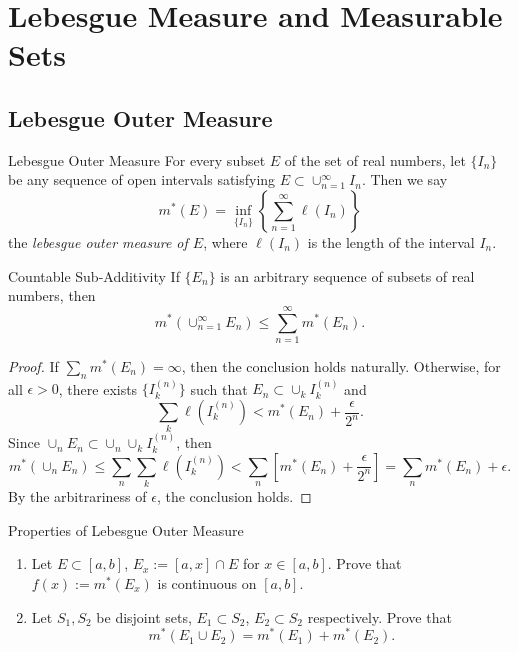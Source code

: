 
\section{Lebesgue Measure and Measurable Sets}

\subsection{Lebesgue Outer Measure}

\begin{definition}{Lebesgue Outer Measure}{}
  For every subset $E$ of the set of real numbers,
  let $\{I_n\}$ be any sequence of open intervals satisfying
  $E \subset \cup _{n = 1}^{\infty} I_n$. Then we say
  \begin{equation}
    m^{\ast} (E) = \inf_{\{I_n\}} \left\{\sum_{n = 1}^{\infty} \ell(I_n)\right\}
  \end{equation}
  the \emph{lebesgue outer measure of $E$},
  where $\ell(I_n)$ is the length of the interval $I_n$.
\end{definition}


\begin{proposition}{Countable Sub-Additivity}{}
  If $\{E_n\}$ is an arbitrary sequence of subsets of real numbers,
  then
  \begin{equation}
    m^{\ast} (\cup _{n = 1}^{\infty} E_n) \leq \sum _{n = 1}^{\infty} m^{\ast}(E_n).
  \end{equation}
\end{proposition}

\begin{proof}
  If $\sum_n m^{\ast}(E_n) = \infty$, then the conclusion holds naturally.
  Otherwise, for all $\epsilon > 0$, there exists $\{I_k^{(n)}\}$ such that
  $E_n \subset \cup_k I_k^{(n)}$ and
  \begin{equation}
    \sum \limits _k \ell(I_k^{(n)}) < m^{\ast}(E_n) + \frac{\epsilon}{2^n}.
  \end{equation}
  Since $\cup _n E_n \subset \cup _n \cup _k I_k^{(n)}$, then
  \begin{equation}
    m^{\ast}(\cup _n E_n)
    \leq \sum _n \sum _k \ell(I_k^{(n)})
    < \sum _n \left[ m^{\ast}(E_n) + \frac{\epsilon}{2^n} \right]
    = \sum _n m^{\ast}(E_n) + \epsilon.
  \end{equation}
  By the arbitrariness of $\epsilon$, the conclusion holds.
\end{proof}

\begin{example}{Properties of Lebesgue Outer Measure}{}
  \begin{enumerate}
  \item Let $E \subset [a, b]$, $E_x := [a, x] \cap E$ for $x \in [a, b]$.
    Prove that $f(x) := m^{\ast}(E_x)$ is continuous on $[a, b]$.
  \item Let $S_1,S_2$ be disjoint sets,
    $E_1 \subset S_2$, $E_2 \subset S_2$ respectively.
    Prove that 
    \begin{equation}
      m^{\ast}(E_1 \cup E_2) = m^{\ast}(E_1) + m^{\ast}(E_2).
    \end{equation}
  \end{enumerate}
\end{example}

